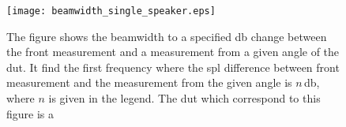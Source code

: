 \begin{figure}[H]
	\centering
	\texttt{[image: beamwidth\_single\_speaker.eps]}
	\caption{The figure shows the beamwidth to a specified \si{\decibel} change between the front measurement and a measurement from a given angle of the \gls{dut}. It find the first frequency where the \gls{spl} difference between front measurement and the measurement from the given angle is $n$\,\si{\decibel}, where $n$ is given in the legend. The \gls{dut} which correspond to this figure is a \citep{seas33}}
		\label{fig:beamwidth_offset_4.5_cm}
\end{figure}